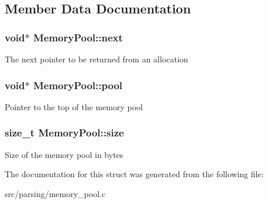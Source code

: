 \subsection{Member Data Documentation}
\hypertarget{structMemoryPool_af5fd87a1dc44d4e5ea496d403c426d92}{
\subsubsection[{next}]{\setlength{\rightskip}{0pt plus 5cm}void$\ast$ Memory\-Pool\-::next}}\label{structMemoryPool_af5fd87a1dc44d4e5ea496d403c426d92}
The next pointer to be returned from an allocation \hypertarget{structMemoryPool_aac9222b12332558fb831f4b9b4400763}{
\subsubsection[{pool}]{\setlength{\rightskip}{0pt plus 5cm}void$\ast$ Memory\-Pool\-::pool}}\label{structMemoryPool_aac9222b12332558fb831f4b9b4400763}
Pointer to the top of the memory pool \hypertarget{structMemoryPool_af554fe1d65607ebfd49e195db299b827}{
\subsubsection[{size}]{\setlength{\rightskip}{0pt plus 5cm}size\-\_\-t Memory\-Pool\-::size}}\label{structMemoryPool_af554fe1d65607ebfd49e195db299b827}
Size of the memory pool in bytes 

The documentation for this struct was generated from the following file\-:\begin{DoxyCompactItemize}
\item 
src/parsing/memory\-\_\-pool.\-c\end{DoxyCompactItemize}
